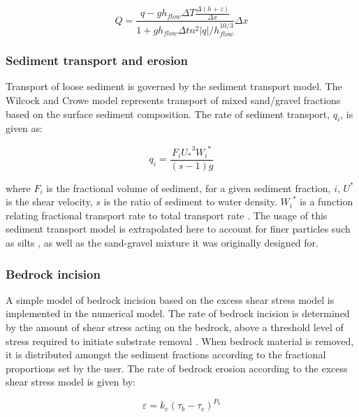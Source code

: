\begin{equation}
Q = \frac{q - g h_{flow} \Delta T \frac{\Delta (h+z) }{\Delta x}}{1 + g h_{flow} \Delta t n^2 |q| / h_{flow}^{10/3}} \Delta x
\end{equation}

\subsubsection{Sediment transport and erosion}

Transport of loose sediment is governed by the \citet{wilcock2003surface} sediment transport model. The Wilcock and Crowe model represents transport of mixed sand/gravel fractions based on the surface sediment composition. The rate of sediment transport, \(q_i\), is given as:

\begin{equation}
q_i = \frac{F_i {U_*}^3 {W_i}^*}{(s -1) g}
\end{equation}

where \(F_i\) is the fractional volume of sediment, for a given sediment fraction, \(i\), \(U^*\) is the shear velocity, \(s\) is the ratio of sediment to water density. \({W_i}^*\) is a function relating fractional transport rate to total transport rate \citep[see][for a full derivation of this equation]{wilcock2003surface}. The usage of this sediment transport model is extrapolated here to account for finer particles such as silts \citep{van2007embedding}, as well as the sand-gravel mixture it was originally designed for.

\subsubsection{Bedrock incision}
\label{bedrock_model}
A simple model of bedrock incision based on the excess shear stress model \citep{tucker2001child,tucker2004drainage} is implemented in the numerical model. The rate of bedrock incision is determined by the amount of shear stress acting on the bedrock, above a threshold level of stress required to initiate substrate removal \citep[e.g.,][]{Snyder2003}. When bedrock material is removed, it is distributed amongst the sediment fractions according to the fractional proportions set by the user. The rate of bedrock erosion according to the excess shear stress model is given by:

\begin{equation}
\varepsilon = k_e(\tau_b - \tau_c)^{P_b}
\end{equation}

